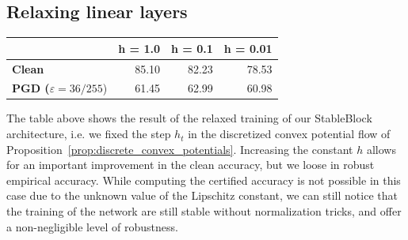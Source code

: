 \subsection{Relaxing linear layers}

\begin{center}
\begin{tabular}{lrrr}
\toprule
  & \multicolumn{1}{c}{\textbf{h = 1.0}} & \multicolumn{1}{c}{\textbf{h = 0.1}} & \multicolumn{1}{c}{\textbf{h = 0.01}} \\
\midrule
\textbf{Clean} & 85.10 & 82.23 & 78.53 \\
\textbf{PGD ($\varepsilon = 36/255$}) & 61.45 & 62.99 & 60.98 \\
\bottomrule
\end{tabular}%
\end{center}
The table above shows the result of the relaxed training of our StableBlock architecture, i.e. we fixed the step $h_t$ in the discretized convex potential flow of Proposition~\ref{prop:discrete_convex_potentials}.
Increasing the constant $h$ allows for an important improvement  in the clean accuracy, but we loose in robust empirical accuracy.
While computing the certified accuracy is not possible in this case due to the unknown value of the Lipschitz constant, we can still notice that the training of the network are still stable without normalization tricks, and offer a non-negligible level of robustness. 



